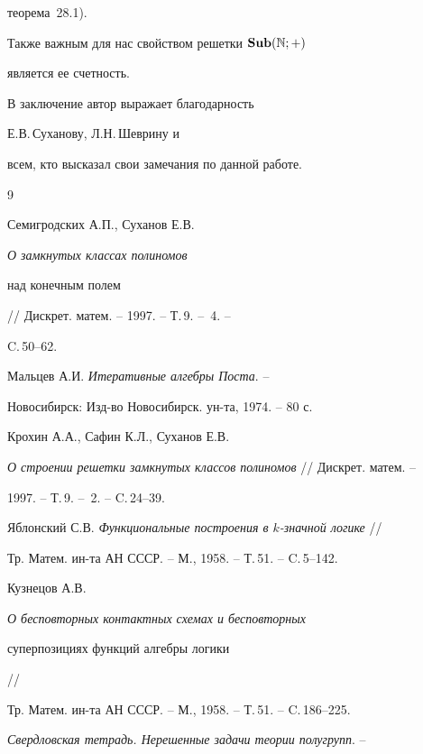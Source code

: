 теорема~28.1).


Также важным для нас свойством решетки $\bold{Sub} (\Bbb N;+)$


является ее счетность.








В заключение автор выражает благодарность


Е.В.\,Суханову, Л.Н.\,Шеврину и


всем, кто высказал свои замечания по данной работе.








\begin{thebibliography}{9}







Семигродских А.П., Суханов Е.В. {\em О замкнутых классах полиномов


над конечным полем} // Дискрет. матем. -- 1997. -- Т.\,9. -- \No\,4. -- 


C.\,50--62.




Мальцев А.И. {\em Итеративные алгебры Поста}. --


Новосибирск: Изд-во Новосибирск. ун-та, 1974. -- 80 с.




Крохин А.А., Сафин К.Л., Суханов Е.В.


{\em О строении решетки замкнутых классов полиномов} // Дискрет. матем. --


1997. -- Т.\,9. -- \No\,2. -- C.\,24--39.




Яблонский С.В. {\em Функциональные построения в $k$-значной логике} //


Тр. Матем. ин-та АН СССР. -- М., 1958. -- Т.\,51. -- C.\,5--142.




Кузнецов А.В. {\em О бесповторных контактных схемах и бесповторных


суперпозициях функций алгебры логики} //


Тр. Матем. ин-та АН СССР. -- М., 1958. -- Т.\,51. -- C.\,186--225.




{\em Свердловская тетрадь. Нерешенные задачи теории полугрупп}. --



\end{thebibliography}
